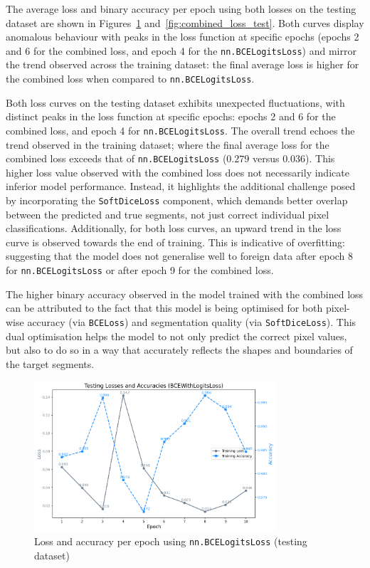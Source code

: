 \documentclass[12pt]{report}
\newcommand{\inlinecode}[1]{\lstinline[style=inline]{#1}}
\begin{document}
The average loss and binary accuracy per epoch using both losses on the testing dataset are shown in Figures~\ref{fig:bce_loss_test} and~\ref{fig:combined_loss_test}. Both curves display anomalous behaviour with peaks in the loss function at specific epochs (epochs 2 and 6 for the combined loss, and epoch 4 for the \inlinecode{nn.BCELogitsLoss}) and mirror the trend observed across the training dataset: the final average loss is higher for the combined loss when compared to \inlinecode{nn.BCELogitsLoss}.

Both loss curves on the testing dataset exhibits unexpected fluctuations, with distinct peaks in the loss function at specific epochs: epochs 2 and 6 for the combined loss, and epoch 4 for \inlinecode{nn.BCELogitsLoss}. The overall trend echoes the trend observed in the training dataset; where the final average loss for the combined loss exceeds that of \inlinecode{nn.BCELogitsLoss} ($0.279$ versus $0.036$). This higher loss value observed with the combined loss does not necessarily indicate inferior model performance. Instead, it highlights the additional challenge posed by incorporating the \inlinecode{SoftDiceLoss} component, which demands better overlap between the predicted and true segments, not just correct individual pixel classifications. Additionally, for both loss curves, an upward trend in the loss curve is observed towards the end of training. This is indicative of overfitting: suggesting that the model does not generalise well to foreign data after epoch 8 for \inlinecode{nn.BCELogitsLoss} or after epoch 9 for the combined loss.

The higher binary accuracy observed in the model trained with the combined loss can be attributed to the fact that this model is being optimised for both pixel-wise accuracy (via \inlinecode{BCELoss}) and segmentation quality (via \inlinecode{SoftDiceLoss}). This dual optimisation helps the model to not only predict the correct pixel values, but also to do so in a way that accurately reflects the shapes and boundaries of the target segments.

\begin{figure}[ht]
    \centering
    \includegraphics[width=0.8\textwidth]{bceloss_test.png}
    \caption{Loss and accuracy per epoch using \inlinecode{nn.BCELogitsLoss} (testing dataset)}
    \label{fig:bce_loss_test}
\end{figure}
\end{document}
